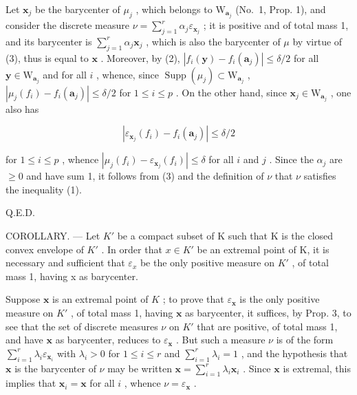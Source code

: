 Let \(\mathbf{x}_j\) be the barycenter of \(\mu_j\) , which belongs to \(\mathrm{W}_{\mathbf{a}_j}\) (No.~1, Prop. 1), and consider the discrete measure \(\nu = \sum_{j=1}^{r} \alpha_j \varepsilon_{\mathbf{x}_j}\) ; it is positive and of total mass 1, and its barycenter is \(\sum_{j=1}^{r} \alpha_j \mathbf{x}_j\) , which is also the barycenter of \(\mu\) by virtue of (3), thus is equal to \(\mathbf{x}\) . Moreover, by (2), \(|f_i(\mathbf{y}) - f_i(\mathbf{a}_j)| \leqslant \delta/2\) for all \(\mathbf{y} \in \mathrm{W}_{\mathbf{a}_j}\) and for all \(i\) , whence, since \(\operatorname{Supp}(\mu_j) \subset \mathrm{W}_{\mathbf{a}_j}\) , \(|\mu_j(f_i) - f_i(\mathbf{a}_j)| \leqslant \delta/2\) for \(1 \leqslant i \leqslant p\) . On the other hand, since \(\mathbf{x}_j \in \mathrm{W}_{\mathbf{a}_j}\) , one also has

\[
\left| \varepsilon_ {\mathbf {x} _ {j}} (f _ {i}) - f _ {i} (\mathbf {a} _ {j}) \right| \leqslant \delta / 2
\]

for \(1 \leqslant i \leqslant p\) , whence \(|\mu_j(f_i) - \varepsilon_{\mathbf{x}_j}(f_i)| \leqslant \delta\) for all \(i\) and \(j\) . Since the \(\alpha_j\) are \(\geqslant 0\) and have sum 1, it follows from (3) and the definition of \(\nu\) that \(\nu\) satisfies the inequality (1).

Q.E.D.

COROLLARY. --- Let \(K'\) be a compact subset of K such that K is the closed convex envelope of \(K'\) . In order that \(x \in K'\) be an extremal point of K, it is necessary and sufficient that \(\varepsilon_{x}\) be the only positive measure on \(K'\) , of total mass 1, having x as barycenter.

Suppose \(\mathbf{x}\) is an extremal point of \(K\) ; to prove that \(\varepsilon_{\mathbf{x}}\) is the only positive measure on \(K'\) , of total mass 1, having \(\mathbf{x}\) as barycenter, it suffices, by Prop. 3, to see that the set of discrete measures \(\nu\) on \(K'\) that are positive, of total mass 1, and have \(\mathbf{x}\) as barycenter, reduces to \(\varepsilon_{\mathbf{x}}\) . But such a measure \(\nu\) is of the form \(\sum_{i=1}^{r} \lambda_i \varepsilon_{\mathbf{x}_i}\) with \(\lambda_i > 0\) for \(1 \leqslant i \leqslant r\) and \(\sum_{i=1}^{r} \lambda_i = 1\) , and the hypothesis that \(\mathbf{x}\) is the barycenter of \(\nu\) may be written \(\mathbf{x} = \sum_{i=1}^{r} \lambda_i \mathbf{x}_i\) . Since \(\mathbf{x}\) is extremal, this implies that \(\mathbf{x}_i = \mathbf{x}\) for all \(i\) , whence \(\nu = \varepsilon_{\mathbf{x}}\) .


